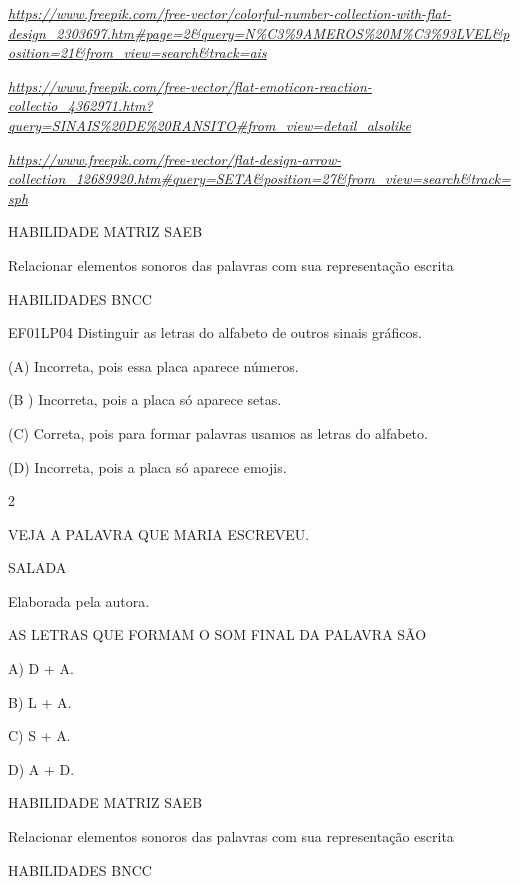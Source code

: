 \begin{escola}
\href{https://www.freepik.com/free-vector/colorful-number-collection-with-flat-design_2303697.htm\#page=2\&query=N\%C3\%9AMEROS\%20M\%C3\%93LVEL\&position=21\&from_view=search\&track=ais}{\emph{https://www.freepik.com/free-vector/colorful-number-collection-with-flat-design\_2303697.htm\#page=2\&query=N\%C3\%9AMEROS\%20M\%C3\%93LVEL\&position=21\&from\_view=search\&track=ais}}

\href{https://www.freepik.com/free-vector/flat-emoticon-reaction-collectio_4362971.htm?query=SINAIS\%20DE\%20RANSITO\#from_view=detail_alsolike}{\emph{https://www.freepik.com/free-vector/flat-emoticon-reaction-collectio\_4362971.htm?query=SINAIS\%20DE\%20RANSITO\#from\_view=detail\_alsolike}}

\href{https://www.freepik.com/free-vector/flat-design-arrow-collection_12689920.htm\#query=SETA\&position=27\&from_view=search\&track=sph}{\emph{https://www.freepik.com/free-vector/flat-design-arrow-collection\_12689920.htm\#query=SETA\&position=27\&from\_view=search\&track=sph}}

HABILIDADE MATRIZ SAEB

Relacionar elementos sonoros das palavras com sua representação escrita

HABILIDADES BNCC

EF01LP04 Distinguir as letras do alfabeto de outros sinais gráficos.

(A) Incorreta, pois essa placa aparece números.

(B ) Incorreta, pois a placa só aparece setas.

(C) Correta, pois para formar palavras usamos as letras do alfabeto.

(D) Incorreta, pois a placa só aparece
emojis.\protect\hypertarget{_heading=h.kl8qv6rrx63u}{}{}

\num{2}

VEJA A PALAVRA QUE MARIA ESCREVEU.

SALADA

Elaborada pela autora.

AS LETRAS QUE FORMAM O SOM FINAL DA PALAVRA SÃO

A) D + A.

B) L + A.

C) S + A.

D) A + D.

HABILIDADE MATRIZ SAEB

Relacionar elementos sonoros das palavras com sua representação escrita

HABILIDADES BNCC


\end{escola}
